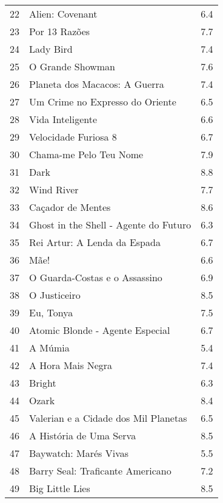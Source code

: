 \begin{tabular}{llr}
22 &                                    Alien: Covenant &      6.4 \\
23 &                                      Por 13 Razões &      7.7 \\
24 &                                          Lady Bird &      7.4 \\
25 &                                   O Grande Showman &      7.6 \\
26 &                      Planeta dos Macacos: A Guerra &      7.4 \\
27 &                    Um Crime no Expresso do Oriente &      6.5 \\
28 &                                   Vida Inteligente &      6.6 \\
29 &                               Velocidade Furiosa 8 &      6.7 \\
30 &                             Chama-me Pelo Teu Nome &      7.9 \\
31 &                                               Dark &      8.8 \\
32 &                                         Wind River &      7.7 \\
33 &                                  Caçador de Mentes &      8.6 \\
34 &              Ghost in the Shell - Agente do Futuro &      6.3 \\
35 &                       Rei Artur: A Lenda da Espada &      6.7 \\
36 &                                               Mãe! &      6.6 \\
37 &                      O Guarda-Costas e o Assassino &      6.9 \\
38 &                                       O Justiceiro &      8.5 \\
39 &                                          Eu, Tonya &      7.5 \\
40 &                    Atomic Blonde - Agente Especial &      6.7 \\
41 &                                            A Múmia &      5.4 \\
42 &                                  A Hora Mais Negra &      7.4 \\
43 &                                             Bright &      6.3 \\
44 &                                              Ozark &      8.4 \\
45 &               Valerian e a Cidade dos Mil Planetas &      6.5 \\
46 &                            A História de Uma Serva &      8.5 \\
47 &                              Baywatch: Marés Vivas &      5.5 \\
48 &                   Barry Seal: Traficante Americano &      7.2 \\
49 &                                    Big Little Lies &      8.5 \\
\bottomrule
\end{tabular}
